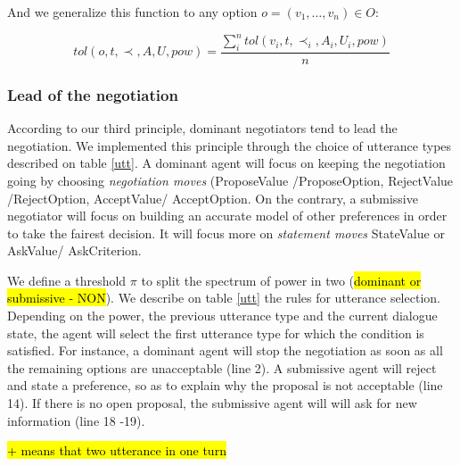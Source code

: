 \documentclass{llncs}
\begin{document}
	And we generalize this function to any option $o=(v_1,\ldots,v_n) \in O$:
	
	\begin{equation}
	tol(o, t, \prec, A, U, pow) = \frac{ \sum_{i}^{n} tol(v_i, t, \prec_i, A_i, U_i, pow) } {n}
	\end{equation}
	
	
	\subsubsection{Lead of the negotiation}
	According to our third principle, dominant negotiators tend to lead the negotiation. We implemented this principle through the choice of utterance types described on table \ref{utt}. A dominant agent will focus on keeping the negotiation going by choosing \emph{negotiation moves} (ProposeValue /ProposeOption, RejectValue /RejectOption, AcceptValue/ AcceptOption. On the contrary, a submissive negotiator will focus on building an accurate model of other preferences in order to take the fairest decision. It will focus more on \emph{statement moves} StateValue or AskValue/ AskCriterion.
	
	We define a threshold $\pi$ to split the spectrum of power in two (\hl{dominant or submissive - NON}). We describe on table \ref{utt} the rules for utterance selection. Depending on the power, the previous utterance type and the current dialogue state, the agent will select the first utterance type for which the condition is satisfied. For instance, a dominant agent will stop the negotiation as soon as all the remaining options are unacceptable (line 2). A submissive agent will reject and state a preference, so as to explain why the proposal is not acceptable (line 14). If there is no open proposal, the submissive agent will will ask for new information (line 18 -19).
	
	\hl{+ means that two utterance in one turn}
\end{document}
